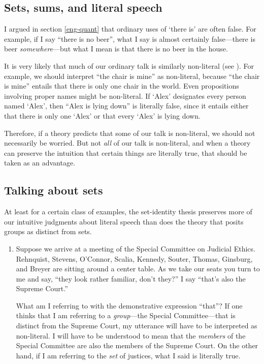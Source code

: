 \documentclass[11pt]{article}
\begin{document}
\begin{spacing}{1.5}
\section{Sets, sums, and literal speech}
\label{talk}
I argued in section \ref{eng-quant} that ordinary uses of `there is'
are often false.  For example, if I say ``there is no beer'', what I
say is almost certainly false---there is beer {\em somewhere}---but
what I mean is that there is no beer in the house.

It is very likely that much of our ordinary talk is similarly
non-literal (see \citet{bach1987}).  For example, we should interpret
``the chair is mine'' as non-literal, because ``the chair is mine''
entails that there is only one chair in the world.  Even propositions
involving proper names might be non-literal.  If `Alex' designates
every person named `Alex', then ``Alex is lying down'' is literally
false, since it entails either that there is only one `Alex' or that
every `Alex' is lying down.

Therefore, if a theory predicts that some of our talk is non-literal,
we should not necessarily be worried.  But not {\em all} of our talk
is non-literal, and when a theory can preserve the intuition that
certain things are literally true, that should be taken as an
advantage.

\subsection{Talking about sets}
\label{sets-talk}
At least for a certain class of examples, the set-identity thesis
preserves more of our intuitive judgments about literal speech than
does the theory that posits groups as distinct from sets.

\begin{enumerate}
  \item Suppose we arrive at a meeting of the Special Committee on
    Judicial Ethics.  Rehnquist, Stevens, O'Connor, Scalia, Kennedy,
    Souter, Thomas, Ginsburg, and Breyer are sitting around a center
    table.  As we take our seats you turn to me and say, ``they look
    rather familiar, don't they?''  I say ``that's also the Supreme
    Court.''

    What am I referring to with the demonstrative expression ``that''?
    If one thinks that I am referring to a {\em group}---the Special
    Committee---that is distinct from the Supreme Court, my utterance
    will have to be interpreted as non-literal.  I will have to be
    understood to mean that the {\em members} of the Special Committee
    are also the members of the Supreme Court.  On the other hand, if
    I am referring to the {\em set} of justices, what I said is
    literally true.


\end{enumerate}
\end{spacing}
\end{document}
